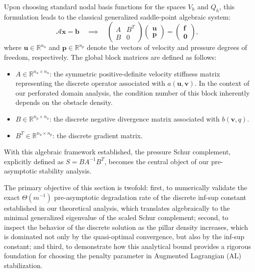 \documentclass{elsarticle}
\begin{document}
Upon choosing standard nodal basis functions for the spaces $V_h$ and $Q_h$, this formulation leads to the classical generalized saddle-point algebraic system:
\begin{equation} \label{eq:saddle_point_system}
    \mathcal{A} \mathbf{x} = \mathbf{b} \quad \implies \quad
    \begin{pmatrix}
        A & B^T \\
        B & 0
    \end{pmatrix}
    \begin{pmatrix}
        \mathbf{u} \\
        \mathbf{p}
    \end{pmatrix}
    =
    \begin{pmatrix}
        \mathbf{f} \\
        \mathbf{0}
    \end{pmatrix},
\end{equation}
where $\mathbf{u} \in \mathbb{R}^{n_u}$ and $\mathbf{p} \in \mathbb{R}^{n_p}$ denote the vectors of velocity and pressure degrees of freedom, respectively. The global block matrices are defined as follows:
\begin{itemize}
    \item $A \in \mathbb{R}^{n_u \times n_u}$: the symmetric positive-definite velocity stiffness matrix representing the discrete operator associated with $a(\mathbf{u}, \mathbf{v})$. In the context of our perforated domain analysis, the condition number of this block inherently depends on the obstacle density.
    \item $B \in \mathbb{R}^{n_p \times n_u}$: the discrete negative divergence matrix associated with $b(\mathbf{v}, q)$.
    \item $B^T \in \mathbb{R}^{n_u \times n_p}$: the discrete gradient matrix.
\end{itemize}

With this algebraic framework established, the pressure Schur complement, explicitly defined as $S = B A^{-1} B^T$, becomes the central object of our pre-asymptotic stability analysis.

The primary objective of this section is twofold: first, to numerically validate the exact $\Theta(m^{-1})$ pre-asymptotic degradation rate of the discrete inf-sup constant established in our theoretical analysis, which translates algebraically to the minimal generalized eigenvalue of the scaled Schur complement; second, to inspect the behavior of the discrete solution as the pillar density increases, which is dominated not only by the quasi-optimal convergence, but also by the inf-sup constant; and third, to demonstrate how this analytical bound provides a rigorous foundation for choosing the penalty parameter in Augmented Lagrangian (AL) stabilization.
\end{document}

